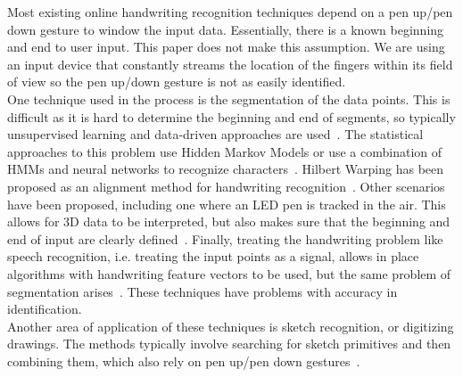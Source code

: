 Most existing online handwriting recognition techniques depend on a pen up/pen down gesture to window the input data. Essentially, there is a known beginning and end to user input. This paper does not make this assumption. We are using an input device that constantly streams the location of the fingers within its field of view so the pen up/down gesture is not as easily identified. \\[1\baselineskip]
One technique used in the process is the segmentation of the data points. This is difficult as it is hard to determine the beginning and end of segments, so typically unsupervised learning and data-driven approaches are used~\cite{plamondon2000online}. The statistical approaches to this problem use Hidden Markov Models or use a combination of HMMs and neural networks to recognize characters~\cite{plotz2009markov}. Hilbert Warping has been proposed as an alignment method for handwriting recognition~\cite{ishida2010hilbert}. Other scenarios have been proposed, including one where an LED pen is tracked in the air. This allows for 3D data to be interpreted, but also makes sure that the beginning and end of input are clearly defined~\cite{asano2010visual}. Finally, treating the handwriting problem like speech recognition, i.e. treating the input points as a signal, allows in place algorithms with handwriting feature vectors to be used, but the same problem of segmentation arises~\cite{starner1994online}. These techniques have problems with accuracy in identification. \\[1\baselineskip]
Another area of application of these techniques is sketch recognition, or digitizing drawings. The methods typically involve searching for sketch primitives and then combining them, which also rely on pen up/pen down gestures~\cite{hammond2011recognizing}. 
